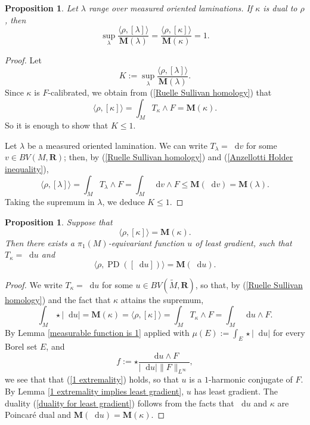 \documentclass[reqno,11pt]{amsart}
\newcommand{\RR}{\mathbf{R}}
\newcommand*\dif{\mathop{}\!\mathrm{d}}
\DeclareMathOperator{\PD}{PD}
\newcommand{\Mass}{\mathbf M}
\newtheorem{proposition}[theorem]{Proposition}
\theoremstyle{definition}
\numberwithin{equation}{section}
\begin{document}
\begin{proposition}
Let $\lambda$ range over measured oriented laminations.
If $\kappa$ is dual to $\rho$, then
	\begin{equation}\label{L equals K formula}
	\sup_\lambda \frac{\langle \rho, [\lambda]\rangle}{\Mass(\lambda)} = \frac{\langle \rho, [\kappa]\rangle}{\Mass(\kappa)} = 1.
	\end{equation}
\end{proposition}
\begin{proof}
Let
$$K :=  \sup_\lambda \frac{\langle \rho, [\lambda]\rangle}{\Mass(\lambda)}.$$
Since $\kappa$ is $F$-calibrated, we obtain from (\ref{Ruelle Sullivan homology}) that
$$\langle \rho, [\kappa]\rangle = \int_M T_\kappa \wedge F = \Mass(\kappa).$$
So it is enough to show that $K \leq 1$.

Let $\lambda$ be a measured oriented lamination.
We can write $T_\lambda = \dif v$ for some $v \in BV(M, \RR)$; then, by (\ref{Ruelle Sullivan homology}) and (\ref{Anzellotti Holder inequality}),
$$\langle \rho, [\lambda]\rangle = \int_M T_\lambda \wedge F = \int_M \dif v \wedge F \leq \Mass(\dif v) = \Mass(\lambda).$$
Taking the supremum in $\lambda$, we deduce $K \leq 1$.
\end{proof}

\begin{proposition}\label{calibrated means measured stretch}
Suppose that
$$\langle \rho, [\kappa]\rangle = \Mass(\kappa).$$
Then there exists a $\pi_1(M)$-equivariant function $u$ of least gradient, such that $T_\kappa = \dif u$ and
\begin{equation}\label{duality for least gradient}
\langle \rho, \PD([\dif u])\rangle = \Mass(\dif u).
\end{equation}
\end{proposition}
\begin{proof}
We write $T_\kappa = \dif u$ for some $u \in BV(\tilde M, \RR)$, so that, by (\ref{Ruelle Sullivan homology}) and the fact that $\kappa$ attains the supremum,
$$\int_M \star |\dif u| = \Mass(\kappa) = \langle \rho, [\kappa]\rangle = \int_M T_\kappa \wedge F = \int_M \dif u \wedge F.$$
By Lemma \ref{measurable function is 1} applied with $\mu(E) := \int_E \star |\dif u|$ for every Borel set $E$, and
$$f := \star \frac{\dif u \wedge F}{|\dif u| \|F\|_{L^\infty}},$$
we see that that (\ref{1 extremality}) holds, so that $u$ is a $1$-harmonic conjugate of $F$.
By Lemma \ref{1 extremality implies least gradient}, $u$ has least gradient.
The duality (\ref{duality for least gradient}) follows from the facts that $\dif u$ and $\kappa$ are Poincar\'e dual and $\Mass(\dif u) = \Mass(\kappa)$.
\end{proof}
\end{document}
